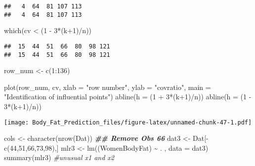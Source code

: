 \documentclass[
]{article}
\newenvironment{Shaded}{\begin{snugshade}}{\end{snugshade}}
\newcommand{\AttributeTok}[1]{\textcolor[rgb]{0.77,0.63,0.00}{#1}}
\newcommand{\CommentTok}[1]{\textcolor[rgb]{0.56,0.35,0.01}{\textit{#1}}}
\newcommand{\DecValTok}[1]{\textcolor[rgb]{0.00,0.00,0.81}{#1}}
\newcommand{\DocumentationTok}[1]{\textcolor[rgb]{0.56,0.35,0.01}{\textbf{\textit{#1}}}}
\newcommand{\FunctionTok}[1]{\textcolor[rgb]{0.00,0.00,0.00}{#1}}
\newcommand{\NormalTok}[1]{#1}
\newcommand{\OtherTok}[1]{\textcolor[rgb]{0.56,0.35,0.01}{#1}}
\newcommand{\SpecialCharTok}[1]{\textcolor[rgb]{0.00,0.00,0.00}{#1}}
\newcommand{\StringTok}[1]{\textcolor[rgb]{0.31,0.60,0.02}{#1}}
\begin{document}
\begin{verbatim}
##   4  64  81 107 113 
##   4  64  81 107 113
\end{verbatim}

\begin{Shaded}
\begin{Highlighting}[]
\FunctionTok{which}\NormalTok{(cv }\SpecialCharTok{\textless{}}\NormalTok{ (}\DecValTok{1} \SpecialCharTok{{-}} \DecValTok{3}\SpecialCharTok{*}\NormalTok{(k}\SpecialCharTok{+}\DecValTok{1}\NormalTok{)}\SpecialCharTok{/}\NormalTok{n))}
\end{Highlighting}
\end{Shaded}

\begin{verbatim}
##  15  44  51  66  80  98 121 
##  15  44  51  66  80  98 121
\end{verbatim}

\begin{Shaded}
\begin{Highlighting}[]
\NormalTok{row\_num }\OtherTok{\textless{}{-}} \FunctionTok{c}\NormalTok{(}\DecValTok{1}\SpecialCharTok{:}\DecValTok{136}\NormalTok{)}
\end{Highlighting}
\end{Shaded}

\begin{Shaded}
\begin{Highlighting}[]
\FunctionTok{plot}\NormalTok{(row\_num, cv, }\AttributeTok{xlab =} \StringTok{"row number"}\NormalTok{,}
     \AttributeTok{ylab =} \StringTok{"covratio"}\NormalTok{, }
     \AttributeTok{main =} \StringTok{"Identification of influential points"}\NormalTok{)}
\FunctionTok{abline}\NormalTok{(}\AttributeTok{h =}\NormalTok{ (}\DecValTok{1} \SpecialCharTok{+} \DecValTok{3}\SpecialCharTok{*}\NormalTok{(k}\SpecialCharTok{+}\DecValTok{1}\NormalTok{)}\SpecialCharTok{/}\NormalTok{n))}
\FunctionTok{abline}\NormalTok{(}\AttributeTok{h =}\NormalTok{ (}\DecValTok{1} \SpecialCharTok{{-}} \DecValTok{3}\SpecialCharTok{*}\NormalTok{(k}\SpecialCharTok{+}\DecValTok{1}\NormalTok{)}\SpecialCharTok{/}\NormalTok{n))}
\end{Highlighting}
\end{Shaded}

\texttt{[image: Body\_Fat\_Prediction\_files/figure-latex/unnamed-chunk-47-1.pdf]}

\begin{Shaded}
\begin{Highlighting}[]
\NormalTok{cols }\OtherTok{\textless{}{-}} \FunctionTok{character}\NormalTok{(}\FunctionTok{nrow}\NormalTok{(Dat))}
\DocumentationTok{\#\# Remove Obs 66}
\NormalTok{dat3 }\OtherTok{\textless{}{-}}\NormalTok{ Dat[}\SpecialCharTok{{-}}\FunctionTok{c}\NormalTok{(}\DecValTok{44}\NormalTok{,}\DecValTok{51}\NormalTok{,}\DecValTok{66}\NormalTok{,}\DecValTok{73}\NormalTok{,}\DecValTok{98}\NormalTok{),]}
\NormalTok{mlr3 }\OtherTok{\textless{}{-}} \FunctionTok{lm}\NormalTok{((WomenBodyFat) }\SpecialCharTok{\textasciitilde{}}\NormalTok{ . , }\AttributeTok{data =}\NormalTok{ dat3)}
\FunctionTok{summary}\NormalTok{(mlr3) }\CommentTok{\#unusual x1 and x2}
\end{Highlighting}
\end{Shaded}
\end{document}
